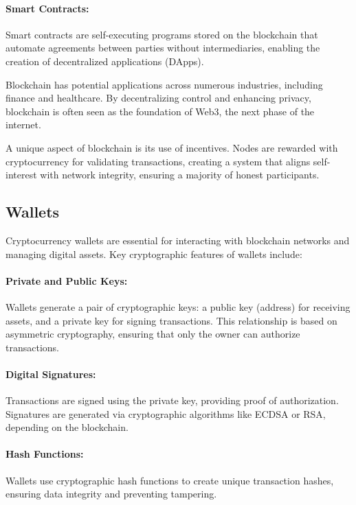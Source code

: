 \paragraph{Smart Contracts:}
Smart contracts are self-executing programs stored on the blockchain that
automate agreements between parties without intermediaries, enabling the
creation of decentralized applications (DApps).

Blockchain has potential applications across numerous industries, including
finance and healthcare. By decentralizing control and enhancing privacy,
blockchain is often seen as the foundation of Web3, the next phase of the
internet.

A unique aspect of blockchain is its use of incentives. Nodes are rewarded with
cryptocurrency for validating transactions, creating a system that aligns
self-interest with network integrity, ensuring a majority of honest
participants.

\subsection{Wallets}
\label{subsec:wallets}

Cryptocurrency wallets are essential for interacting with blockchain networks
and managing digital assets. Key cryptographic features of wallets include:

\paragraph{Private and Public Keys:}
Wallets generate a pair of cryptographic keys: a public key (address) for
receiving assets, and a private key for signing transactions. This relationship
is based on asymmetric cryptography, ensuring that only the owner can authorize
transactions.

\paragraph{Digital Signatures:}
Transactions are signed using the private key, providing proof of
authorization. Signatures are generated via cryptographic algorithms like ECDSA
or RSA, depending on the blockchain.

\paragraph{Hash Functions:}
Wallets use cryptographic hash functions to create unique transaction hashes,
ensuring data integrity and preventing tampering.

